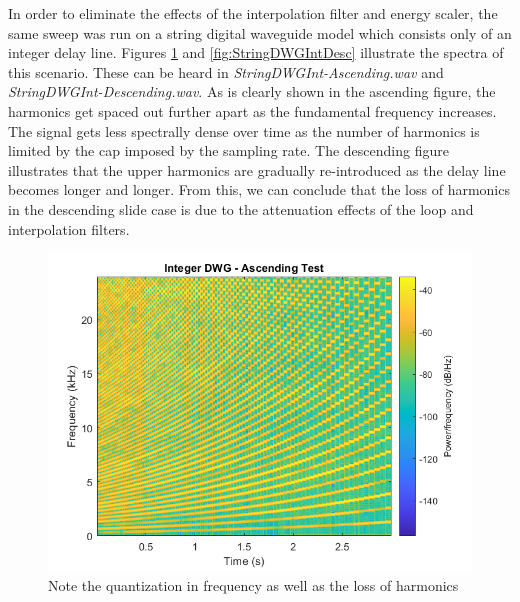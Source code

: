 \documentclass[../main.tex]{subfiles}
\begin{document}
In order to eliminate the effects of the interpolation filter and energy scaler, the same sweep was run on a string digital waveguide model which consists only of an integer delay line. Figures \ref{fig:StringDWGIntAsc} and \ref{fig:StringDWGIntDesc} illustrate the spectra of this scenario. These can be heard in \emph{StringDWGInt-Ascending.wav} and \emph{StringDWGInt-Descending.wav}. As is clearly shown in the ascending figure,  the harmonics get spaced out further apart as the fundamental frequency increases. The signal gets less spectrally dense over time as the number of harmonics is limited by the cap imposed by the sampling rate. The descending figure illustrates that the upper harmonics are gradually re-introduced as the delay line becomes longer and longer. From this, we can conclude that the loss of harmonics in the descending slide case is due to the attenuation effects of the loop and interpolation filters.

\begin{figure}[h]
    \centering
    \includegraphics[scale=.65]{./images/plots/StringDWGIntAsc.png}
    \caption{Note the quantization in frequency as well as the loss of harmonics}
    \label{fig:StringDWGIntAsc}
\end{figure}
\end{document}
